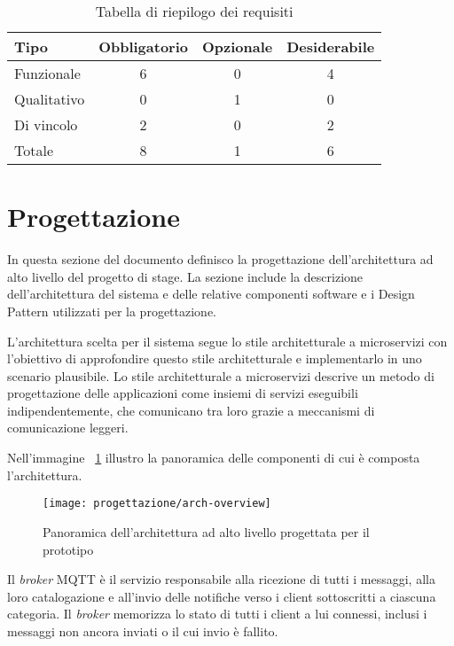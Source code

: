\begin{table}[H]
\caption{Tabella di riepilogo dei requisiti}
\label{tab:requisiti-riepilogo}
\begin{tabularx}{\linewidth}{|X|c|c|c|}
\hline
\textbf{Tipo} & \textbf{Obbligatorio} & \textbf{Opzionale} & \textbf{Desiderabile} \\
\hline
Funzionale & 6 & 0 & 4 \\
\hline
Qualitativo & 0 & 1 & 0 \\
\hline
Di vincolo & 2 & 0 & 2 \\
\hline
Totale & 8 & 1 & 6 \\
\hline
\end{tabularx}
\end{table}

\pagebreak

\section{Progettazione}


In questa sezione del documento definisco la progettazione dell'architettura ad alto livello del progetto di stage.
La sezione include la descrizione dell'architettura del sistema e delle relative componenti software e i Design Pattern utilizzati per la progettazione.


L'architettura scelta per il sistema segue lo stile architetturale a microservizi con l'obiettivo di approfondire questo stile architetturale e implementarlo in uno scenario plausibile.
Lo stile architetturale a microservizi descrive un metodo di progettazione delle applicazioni come insiemi di servizi eseguibili indipendentemente, che comunicano tra loro grazie a meccanismi di comunicazione leggeri.

Nell'immagine ~\ref{img:overview-arch} illustro la panoramica delle componenti di cui è composta l'architettura.

\begin{figure}[H]
    \centering
    \texttt{[image: progettazione/arch-overview]}
    \caption{Panoramica dell'architettura ad alto livello progettata per il prototipo}
    \label{img:overview-arch}
\end{figure}


Il \emph{broker} MQTT è il servizio responsabile alla ricezione di tutti i messaggi, alla loro catalogazione e all'invio delle notifiche verso i client sottoscritti a ciascuna categoria.
Il \emph{broker} memorizza lo stato di tutti i client a lui connessi, inclusi i messaggi non ancora inviati o il cui invio è fallito.


